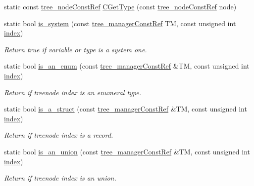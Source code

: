 \begin{DoxyCompactItemize}
static const \hyperlink{tree__node_8hpp_a3cf5d02292c940f3892425a5b5fdec3c}{tree\+\_\+node\+Const\+Ref} \hyperlink{classtree__helper_ab889be102080bfbbbb7cf7b69c3e932d}{C\+Get\+Type} (const \hyperlink{tree__node_8hpp_a3cf5d02292c940f3892425a5b5fdec3c}{tree\+\_\+node\+Const\+Ref} node)
\item 
static bool \hyperlink{classtree__helper_a40fcd51b5a839f80fc2120307e240d39}{is\+\_\+system} (const \hyperlink{tree__manager_8hpp_a792e3f1f892d7d997a8d8a4a12e39346}{tree\+\_\+manager\+Const\+Ref} TM, const unsigned int \hyperlink{tutorial__pact__2019_2Introduction_2third_2include_2Keccak_8h_a028c9bdc8344cca38ab522a337074797}{index})
\begin{DoxyCompactList}\small\item\em Return true if variable or type is a system one. \end{DoxyCompactList}\item 
static bool \hyperlink{classtree__helper_ad18a626687479193e34f341bf2cc131e}{is\+\_\+an\+\_\+enum} (const \hyperlink{tree__manager_8hpp_a792e3f1f892d7d997a8d8a4a12e39346}{tree\+\_\+manager\+Const\+Ref} \&TM, const unsigned int \hyperlink{tutorial__pact__2019_2Introduction_2third_2include_2Keccak_8h_a028c9bdc8344cca38ab522a337074797}{index})
\begin{DoxyCompactList}\small\item\em Return if treenode index is an enumeral type. \end{DoxyCompactList}\item 
static bool \hyperlink{classtree__helper_a6035a0cd06adda67cd4e0ff655f30527}{is\+\_\+a\+\_\+struct} (const \hyperlink{tree__manager_8hpp_a792e3f1f892d7d997a8d8a4a12e39346}{tree\+\_\+manager\+Const\+Ref} \&TM, const unsigned int \hyperlink{tutorial__pact__2019_2Introduction_2third_2include_2Keccak_8h_a028c9bdc8344cca38ab522a337074797}{index})
\begin{DoxyCompactList}\small\item\em Return if treenode index is a record. \end{DoxyCompactList}\item 
static bool \hyperlink{classtree__helper_abc58540390ce3475eb640025e1e6ea61}{is\+\_\+an\+\_\+union} (const \hyperlink{tree__manager_8hpp_a792e3f1f892d7d997a8d8a4a12e39346}{tree\+\_\+manager\+Const\+Ref} \&TM, const unsigned int \hyperlink{tutorial__pact__2019_2Introduction_2third_2include_2Keccak_8h_a028c9bdc8344cca38ab522a337074797}{index})
\begin{DoxyCompactList}\small\item\em Return if treenode index is an union. \end{DoxyCompactList}\item 

\end{DoxyCompactItemize}
